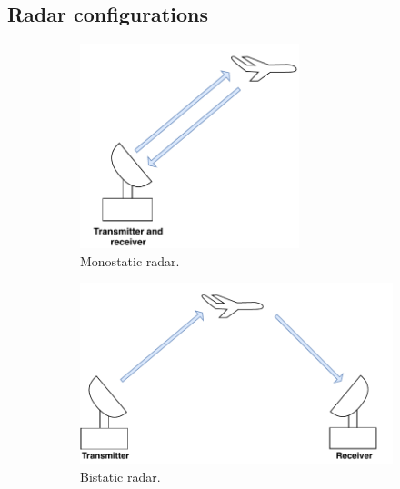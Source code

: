 \documentclass[english, 12pt, a4paper, elec, utf8, a-1b, online]{aaltothesis}
\begin{document}
\subsection{Radar configurations} \label{sec:radar_types}

\begin{figure}[htb]
    \centering
    \begin{subfigure}[b]{0.45\textwidth}
        \includegraphics[width=0.7\textwidth]{figures/background/radar_types_monostatic.pdf}
        \caption{Monostatic radar.}
        \label{fig:monostatic_radar}
    \end{subfigure}
    \hfill
    \begin{subfigure}[b]{0.45\textwidth}
        \includegraphics[width=\textwidth]{figures/background/radar_types_bistatic.pdf}
        \caption{Bistatic radar.}
        \label{fig:bistatic_radar}
    \end{subfigure}
    \hfill
    \begin{subfigure}[b]{0.45\textwidth}

\end{subfigure}
\end{figure}
\end{document}

